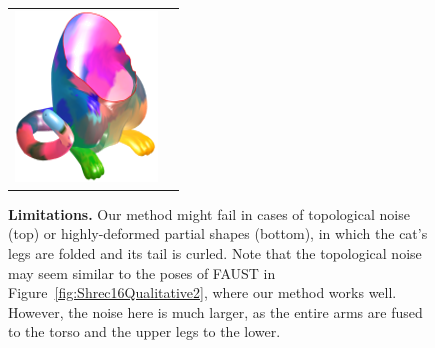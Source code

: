 \begin{figure}[tb]
\begin{tabular}{cc}
		\includegraphics[scale=0.6]{figures/catFail.png}
	\end{tabular}
	\caption{{\textbf{Limitations.}} Our method might fail in cases of topological noise (top) or highly-deformed partial shapes (bottom), in which the cat's legs are folded and its tail is curled. Note that the topological noise may seem similar to the poses of FAUST in Figure~\ref{fig:Shrec16Qualitative2}, where our method works well.
		However, the noise here is much larger, as the entire arms are fused to the torso and the upper legs to the lower.}
	\label{fig:FailureCases}
\end{figure}
